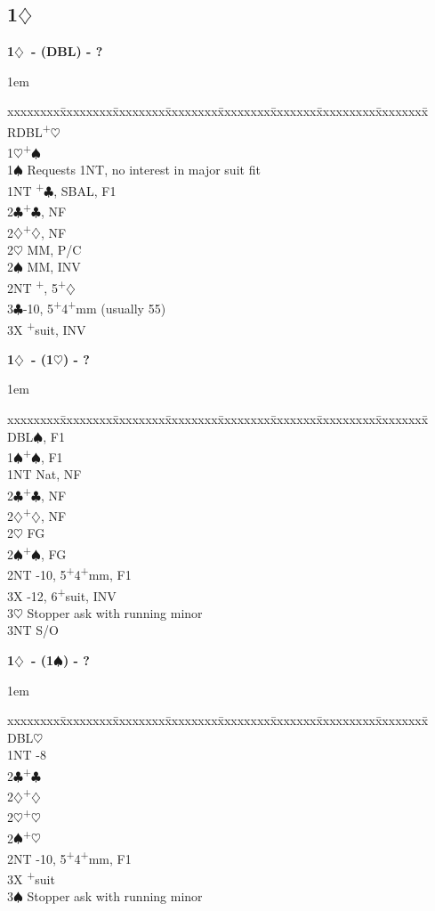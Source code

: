 \documentclass[10pt]{article}
\renewcommand{\c}{$\clubsuit$}
\renewcommand{\d}{$\diamondsuit$}
\newcommand{\h}{$\heartsuit$}
\newcommand{\s}{$\spadesuit$}
\newcommand{\p}{\textsuperscript{+}}
\newcommand{\x}{DBL}
\newcommand{\xx}{RDBL}
\newenvironment{bidtable}[1][]
{\textbf{#1}
  \begin{adjustwidth}{1em}{}
    \addvspace{2pt}
    \begin{tabbing}
      xxxxxxxx\=xxxxxxxx\=xxxxxxxx\=xxxxxxxx\=xxxxxxxx\=xxxxxxx\=xxxxxxxxx\=xxxxxxxx\=\kill}
{\end{tabbing}\end{adjustwidth}\bigskip}%
\newcommand{\pdfd}{\texorpdfstring{\d{}}{D}}
\begin{document}
\subsection{1\pdfd}

\begin{bidtable}[1\d\ - (\x) - ?]
\xx  {}\p\h                                       \\
1\h {}\p\s                                       \\
1\s \> Requests 1NT, no interest in major suit fit \\
1NT \p\c, SBAL, F1                             \\
2\c {}\p\c, NF                                   \\
2\d {}\p\d, NF                                   \\
2\h {} MM, P/C                                  \\
2\s {} MM, INV                                  \\
2NT \p, 5\p\d                                 \\
3\c {}-10, 5\p4\p mm (usually 55)                \\
3X  \p suit, INV                               \\
\end{bidtable}

\begin{bidtable}[1\d\ - (1\h) - ?]
\x  {}\s, F1                        \\
1\s {}\p\s, F1                      \\
1NT \> Nat, NF                        \\
2\c {}\p\c, NF                      \\
2\d {}\p\d, NF                      \\
2\h \> FG                             \\
2\s {}\p\s, FG                      \\
2NT -10, 5\p4\p mm, F1                \\
3X  -12, 6\p suit, INV            \\
3\h \> Stopper ask with running minor \\
3NT \> S/O                            \\
\end{bidtable}

\begin{bidtable}[1\d\ - (1\s) - ?]
\x  {}\h                            \\
1NT -8                            \\
2\c {}\p\c                          \\
2\d {}\p\d                          \\
2\h {}\p\h                          \\
2\s {}\p\h                          \\
2NT -10, 5\p4\p mm, F1            \\
3X  \p suit                       \\
3\s \> Stopper ask with running minor \\
\end{bidtable}
\end{document}
